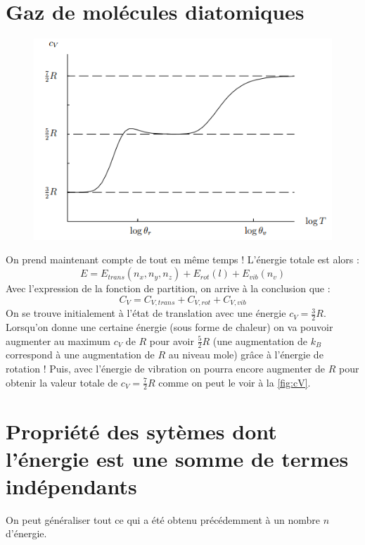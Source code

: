 \documentclass	[11pt, a4paper, openany]{book}
\begin{document}
\section{Gaz de molécules diatomiques}
\begin{figure}
\includegraphics[scale=0.4]{img/image6.png}
\label{fig:cV}
\end{figure}
On prend maintenant compte de tout en même temps ! L'énergie totale est alors :
\begin{equation}
E = E_{trans}(n_x,n_y,n_z) + E_{rot}(l) + E_{vib}(n_v)
\end{equation}
Avec l'expression de la fonction de partition, on arrive à la conclusion que :
\begin{equation}
C_V = C_{V,trans} + C_{V,rot} + C_{V,vib}
\end{equation}
On se trouve initialement à l'état de translation avec une énergie $c_V = \frac{3}{2}R$.
Lorsqu'on donne une certaine énergie (sous forme de chaleur) on va pouvoir augmenter 
au maximum $c_V$ de $R$ pour avoir $\frac{5}{2}R$ (une augmentation de $k_B$ correspond à
une augmentation de $R$ au niveau mole) grâce à l'énergie de rotation ! Puis, avec l'énergie
de vibration on pourra encore augmenter de $R$ pour obtenir la valeur totale de $c_V = \frac{7}{2}
R$ comme on peut le voir à la \autoref{fig:cV}.

\section{Propriété des sytèmes dont l'énergie est une somme de termes indépendants}
On peut généraliser tout ce qui a été obtenu précédemment à un nombre $n$ d'énergie.













































	
\end{document}
